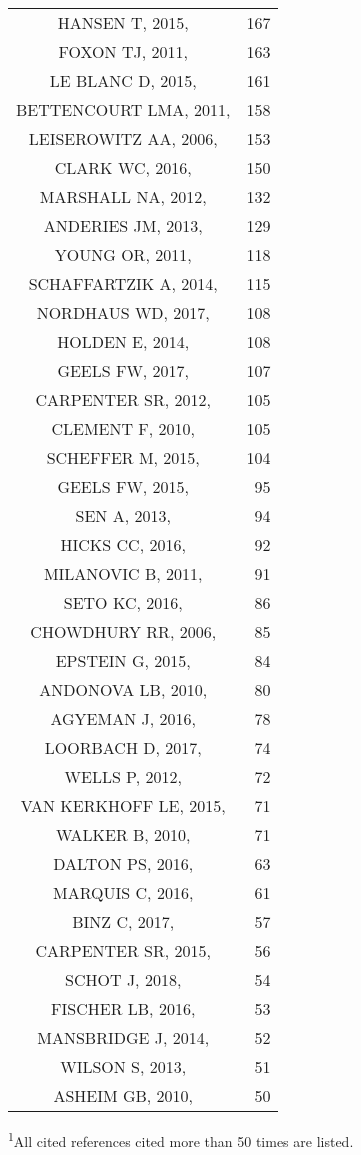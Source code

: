 \documentclass[]{article}
\begin{document}
\begin{longtable}{cr}
HANSEN T, 2015,  & 167 \\ 
FOXON TJ, 2011,  & 163 \\ 
LE BLANC D, 2015,  & 161 \\ 
BETTENCOURT LMA, 2011,  & 158 \\ 
LEISEROWITZ AA, 2006,  & 153 \\ 
CLARK WC, 2016,  & 150 \\ 
MARSHALL NA, 2012,  & 132 \\ 
ANDERIES JM, 2013,  & 129 \\ 
YOUNG OR, 2011,  & 118 \\ 
SCHAFFARTZIK A, 2014,  & 115 \\ 
NORDHAUS WD, 2017,  & 108 \\ 
HOLDEN E, 2014,  & 108 \\ 
GEELS FW, 2017,  & 107 \\ 
CARPENTER SR, 2012,  & 105 \\ 
CLEMENT F, 2010,  & 105 \\ 
SCHEFFER M, 2015,  & 104 \\ 
GEELS FW, 2015,  & 95 \\ 
SEN A, 2013,  & 94 \\ 
HICKS CC, 2016,  & 92 \\ 
MILANOVIC B, 2011,  & 91 \\ 
SETO KC, 2016,  & 86 \\ 
CHOWDHURY RR, 2006,  & 85 \\ 
EPSTEIN G, 2015,  & 84 \\ 
ANDONOVA LB, 2010,  & 80 \\ 
AGYEMAN J, 2016,  & 78 \\ 
LOORBACH D, 2017,  & 74 \\ 
WELLS P, 2012,  & 72 \\ 
VAN KERKHOFF LE, 2015,  & 71 \\ 
WALKER B, 2010,  & 71 \\ 
DALTON PS, 2016,  & 63 \\ 
MARQUIS C, 2016,  & 61 \\ 
BINZ C, 2017,  & 57 \\ 
CARPENTER SR, 2015,  & 56 \\ 
SCHOT J, 2018,  & 54 \\ 
FISCHER LB, 2016,  & 53 \\ 
MANSBRIDGE J, 2014,  & 52 \\ 
WILSON S, 2013,  & 51 \\ 
ASHEIM GB, 2010,  & 50 \\ 
\bottomrule
\end{longtable}
\vspace{-5mm}
\begin{minipage}{\linewidth}
\textsuperscript{1}All cited references cited more than 50 times are listed. \\ 
\end{minipage}
\end{document}
